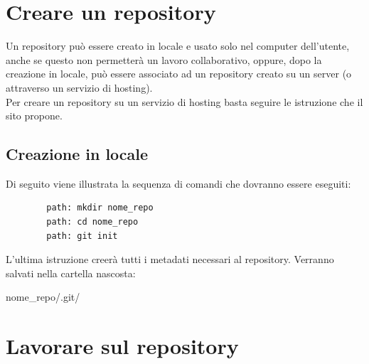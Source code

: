 
\newpage \clearpage
\section{Creare un repository} %
\label{sec:creare_un_repository}
Un repository può essere creato in locale e usato solo nel computer dell'utente, anche se questo non permetterà un lavoro collaborativo, oppure, dopo la creazione in locale, può essere associato ad un repository creato su un server (o attraverso un servizio di hosting). \\
Per creare un repository su un servizio di hosting basta seguire le istruzione che il sito propone.
	\subsection{Creazione in locale} %
	\label{sub:creazione_in_locale}
	Di seguito viene illustrata la sequenza di comandi che dovranno essere eseguiti:
		\begin{verbatim}
		path: mkdir nome_repo
		path: cd nome_repo
		path: git init
		\end{verbatim}
	\noindent
	L'ultima istruzione creerà tutti i metadati necessari al repository. Verranno salvati nella cartella nascosta:
		\begin{center}
			nome\_repo/.git/
		\end{center}

	

\newpage \clearpage
\section{Lavorare sul repository} %
\label{sec:lavorare_sul_repository}

